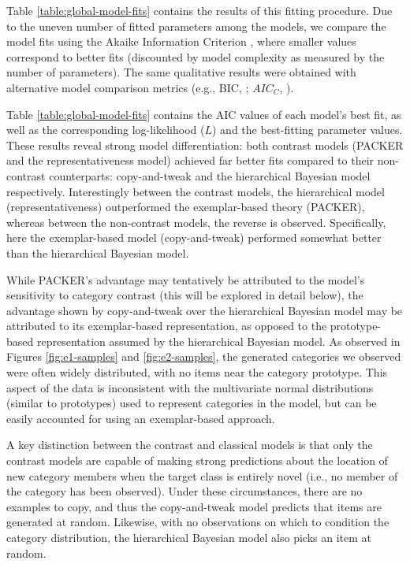 \documentclass[12pt]{article}
\begin{document}
\begin{flushleft}
Table \ref{table:global-model-fits} contains the results of this fitting
procedure. Due to the uneven number of fitted parameters among the models, we
compare the model fits using the Akaike Information Criterion
\citep[AIC;][]{akaike1974new}, where smaller values correspond to better fits
(discounted by model complexity as measured by the number of parameters). The
same qualitative results were obtained with alternative model comparison metrics
(e.g., BIC, \citealp{schwarz1978estimating}; $AIC_C$,
\citealp{hurvich1989regression}).

Table \ref{table:global-model-fits} contains the AIC values of each model's best
fit, as well as the corresponding log-likelihood ($L$) and the best-fitting
parameter values. These results reveal strong model differentiation: both
contrast models (PACKER and the representativeness model) achieved far better
fits compared to their non-contrast counterparts: copy-and-tweak and the
hierarchical Bayesian model respectively. Interestingly between the contrast
models, the hierarchical model (representativeness) outperformed the
exemplar-based theory (PACKER), whereas between the non-contrast models, the
reverse is observed. Specifically, here the exemplar-based model
(copy-and-tweak) performed somewhat better than the hierarchical Bayesian model.

While PACKER's advantage may tentatively be attributed to the model's
sensitivity to category contrast (this will be explored in detail below), the
advantage shown by copy-and-tweak over the hierarchical Bayesian model may be
attributed to its exemplar-based representation, as opposed to the
prototype-based representation assumed by the hierarchical Bayesian model. As
observed in Figures \ref{fig:e1-samples} and \ref{fig:e2-samples}, the generated
categories we observed were often widely distributed, with no items near the
category prototype. This aspect of the data is inconsistent with the
multivariate normal distributions (similar to prototypes) used to represent
categories in the \cite{jern2013probabilistic} model, but can be easily
accounted for using an exemplar-based approach.

A key distinction between the contrast and classical models is that only the
contrast models are capable of making strong predictions about the location of
new category members when the target class is entirely novel (i.e., no member of
the category has been observed). Under these circumstances, there are no
examples to copy, and thus the copy-and-tweak model predicts that items are
generated at random. Likewise, with no observations on which to condition the
category distribution, the hierarchical Bayesian model also picks an item at
random.


\end{flushleft}
\end{document}
